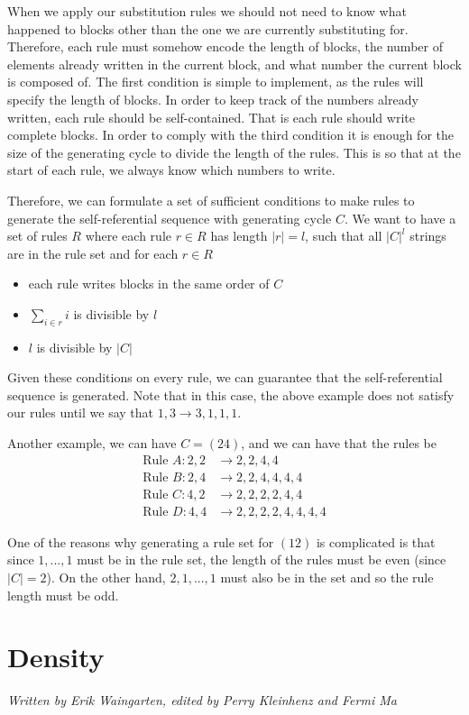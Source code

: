 \documentclass[runningheads,a4paper]{llncs}
\begin{document}
When we apply our substitution rules we should not need to know what happened to blocks other than the one we are currently substituting for. Therefore, each rule must somehow encode the length of  blocks, the number of elements already written in the current block, and what number the current block is composed of. The first condition is simple to implement, as the rules will specify the length of blocks. In order to keep track of the numbers already written, each rule should be self-contained. That is each rule should write complete blocks. In order to comply with the third condition it is enough for the size of the generating cycle to divide the length of the rules. This is so that at the start of each rule, we always know which numbers to write.

Therefore, we can formulate a set of sufficient conditions to make rules to generate the self-referential sequence with generating cycle $C$. We want to have a set of rules $R$ where each rule $r \in R$ has length $|r| = l$, such that all $|C|^{l}$ strings are in the rule set and for each $r \in R$
\begin{itemize}
\item each rule writes blocks in the same order of $C$
\item $\sum_{i \in r} i$ is divisible by $l$
\item $l$ is divisible by $|C|$
\end{itemize}
Given these conditions on every rule, we can guarantee that the self-referential sequence is generated. Note that in this case, the above example does not satisfy our rules until we say that $1, 3 \to 3, 1, 1, 1$.

Another example, we can have $C = (2 4)$, and we can have that the rules be
\begin{align*}
\text{Rule }A: 2,2 &\to 2, 2, 4, 4 \\
\text{Rule }B: 2,4 &\to 2, 2, 4,4,4,4\\
\text{Rule }C: 4,2 &\to 2,2,2,2,4,4\\
\text{Rule }D: 4,4 &\to 2, 2, 2, 2, 4, 4, 4, 4
\end{align*}

One of the reasons why generating a rule set for $(1 2)$ is complicated is that since $1, ..., 1$ must be in the rule set, the length of the rules must be even (since $|C| = 2$). On the other hand, $2, 1, ..., 1$ must also be in the set and so the rule length must be odd. 

\section{Density}
\label{density}
\emph{Written by Erik Waingarten, edited by Perry Kleinhenz and Fermi Ma}
\end{document}
